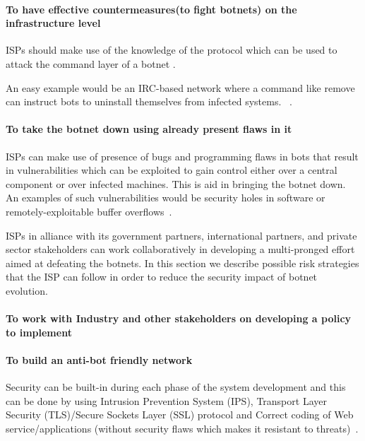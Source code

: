 \paragraph{To have effective countermeasures(to fight botnets) on the infrastructure level}

ISPs should make use of the knowledge of the protocol which can be used to attack the command layer of a botnet .

An easy example would be an IRC-based network where a command like remove can instruct bots to uninstall themselves from infected systems. ~\cite{leder2009proactive}.


\paragraph{To take the botnet down using already present flaws in it}

ISPs can make use of presence of bugs and programming flaws in bots that result in vulnerabilities which can be exploited to gain control either over a central component or over infected machines. This is aid in bringing the botnet down. An examples of such vulnerabilities would be security holes in software or remotely-exploitable buffer overflows~\cite{leder2009proactive}.

ISPs in alliance with its government partners, international partners, and private sector stakeholders can work collaboratively in developing a multi-pronged effort aimed at defeating the botnets. In this section we describe possible risk strategies that the ISP can follow in order to reduce the security impact of botnet evolution.

\paragraph{To work with Industry and other stakeholders on developing a policy to implement}


\paragraph{To build an anti-bot friendly network}

Security can be built-in during each phase of the system development and this can be done by using Intrusion Prevention System (IPS), Transport Layer Security (TLS)/Secure Sockets Layer (SSL) protocol and Correct coding of Web service/applications (without security flaws which makes it resistant to threats)~\cite{stankovic2009defense}.


